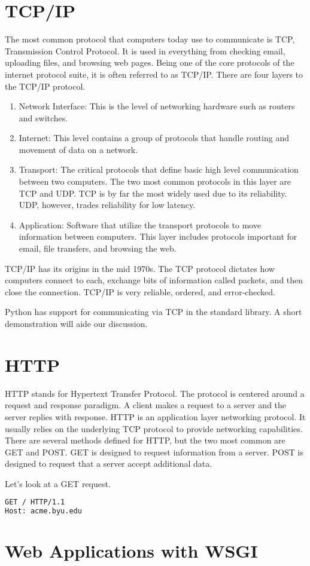 \section*{TCP/IP}
The most common protocol that computers today use to communicate is TCP, Transmission Control Protocol.
It is used in everything from checking email, uploading files, and browsing web pages.
Being one of the core protocols of the internet protocol suite, it is often referred to as TCP/IP.
There are four layers to the TCP/IP protocol.
\begin{enumerate}
\item Network Interface: This is the level of networking hardware such as routers and switches.
\item Internet: This level contains a group of protocols that handle routing and movement of data on a network.
\item Transport: The critical protocols that define basic high level communication between two computers.
The two most common protocols in this layer are TCP and UDP.  TCP is by far the most widely used due to its reliability.
UDP, however, trades reliability for low latency.
\item Application: Software that utilize the transport protocols to move information between computers.
This layer includes protocols important for email, file transfers, and browsing the web.
\end{enumerate}

TCP/IP has its origins in the mid 1970s.
The TCP protocol dictates how computers connect to each, exchange bits of information called packets, and then close the connection.
TCP/IP is very reliable, ordered, and error-checked.

Python has support for communicating via TCP in the standard library.
A short demonstration will aide our discussion.




\section*{HTTP}
HTTP stands for Hypertext Transfer Protocol.
The protocol is centered around a request and response paradigm.
A client makes a request to a server and the server replies with response.
HTTP is an application layer networking protocol.
It usually relies on the underlying TCP protocol to provide networking capabilities.
There are several methods defined for HTTP, but the two most common are GET and POST.
GET is designed to request information from a server.
POST is designed to request that a server accept additional data.

Let's look at a GET request.
\begin{lstlisting}[language=HTML]
GET / HTTP/1.1
Host: acme.byu.edu
\end{lstlisting}

\section*{Web Applications with WSGI}
